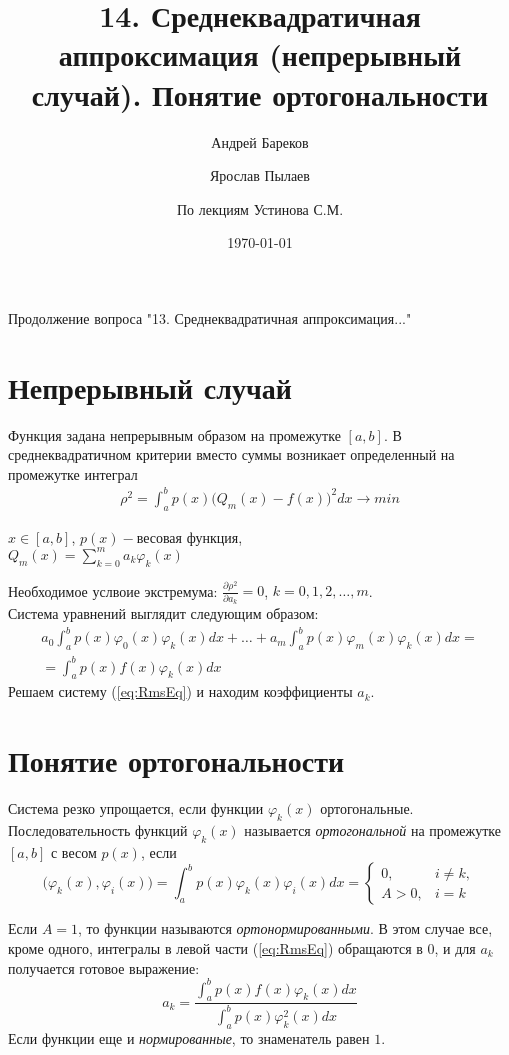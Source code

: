 \documentclass[a4paper,11pt]{article}
\title{14. Среднеквадратичная аппроксимация (непрерывный случай). Понятие ортогональности}
\author{Андрей Бареков \and Ярослав Пылаев \and По лекциям Устинова С.М.}
\date{\today}
\begin{document}
\maketitle
\newpage

Продолжение вопроса "13. Среднеквадратичная аппроксимация..."
\section{Непрерывный случай}
Функция задана непрерывным образом на промежутке $[a,b]$.
В среднеквадратичном критерии вместо суммы возникает определенный на промежутке интеграл
\begin{gather*}
  \rho^2 = \int_a^b p(x)\bigg( Q_m(x)-f(x) \bigg)^2 dx \rightarrow min
\end{gather*}
\begin{flushright}
  \small
  $x\in [a,b]$, $p(x) - \text{весовая функция}$, \\
  $Q_m(x) = \sum_{k=0}^m a_k\varphi_k(x)$
\end{flushright}
Необходимое услвоие экстремума: $\frac{\partial \rho^2}{\partial a_k} = 0$, $k=0,1,2,\dots,m$. \\
Система уравнений выглядит следующим образом: \\
\begin{equation}
  \begin{split}
    a_0\int_a^b p(x)\varphi_0(x)\varphi_k(x)dx +\dots+ a_m\int_a^b p(x)\varphi_m(x)\varphi_k(x)dx = \\
    = \int_a^b p(x)f(x)\varphi_k(x)dx
  \end{split}
  \label{eq:RmsEq}
\end{equation}
Решаем систему (\ref{eq:RmsEq}) и находим коэффициенты $a_k$. \\

\section{Понятие ортогональности}
Система резко упрощается, если функции ${\varphi_k(x)}$ ортогональные.
Последовательность функций ${\varphi_k(x)}$ называется \textit{ортогональной} на промежутке $[a,b]$ с весом $p(x)$, если
\begin{equation}
 \bigg(\varphi_k(x), \varphi_i(x)\bigg) = \int_a^b p(x)\varphi_k(x)\varphi_i(x)dx =
 \begin{cases}
   0, & i \ne k, \\
   A>0, & i=k
 \end{cases}
\end{equation}

Если $A=1$, то функции называются \textit{ортонормированными}. В этом случае все, кроме одного, интегралы в левой части
(\ref{eq:RmsEq}) обращаются в $0$, и для $a_k$ получается готовое выражение:
\begin{equation*}
  a_k = \frac{\int_a^b p(x)f(x)\varphi_k(x)dx}{\int_a^b p(x)\varphi_k^2(x)dx}
\end{equation*}
Если функции еще и \textit{нормированные}, то знаменатель равен $1$.
\end{document}
